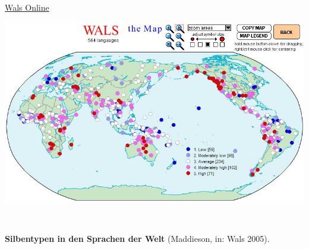 \documentclass[
]{article}
\begin{document}
\href{https://wals.info/}{Wals Online}

\includegraphics[width=1\linewidth]{pictures/01b_NSG_Intro_2020-10-07/wals_vowel_consonant_ratio}

~

\textbf{Silbentypen in den Sprachen der Welt} (Maddieson, in: Wals 2005).
\end{document}
